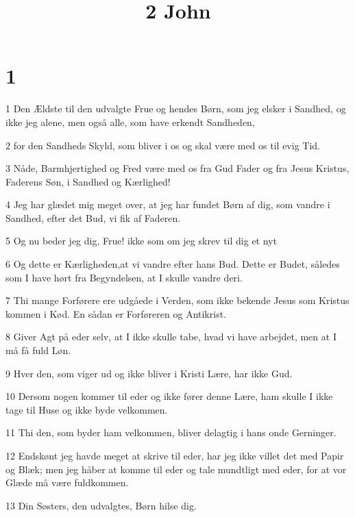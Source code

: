 

\title{2 John}


\chapter{1}

\par 1 Den Ældste til den udvalgte Frue og hendes Børn, som jeg elsker i Sandhed, og ikke jeg alene, men også alle, som have erkendt Sandheden,
\par 2 for den Sandheds Skyld, som bliver i os og skal være med os til evig Tid.
\par 3 Nåde, Barmhjertighed og Fred være med os fra Gud Fader og fra Jesus Kristus, Faderens Søn, i Sandhed og Kærlighed!
\par 4 Jeg har glædet mig meget over, at jeg har fundet Børn af dig, som vandre i Sandhed, efter det Bud, vi fik af Faderen.
\par 5 Og nu beder jeg dig, Frue! ikke som om jeg skrev til dig et nyt
\par 6 Og dette er Kærligheden,at vi vandre efter hans Bud. Dette er Budet, således som I have hørt fra Begyndelsen, at I skulle vandre deri.
\par 7 Thi mange Forførere ere udgåede i Verden, som ikke bekende Jesus som Kristus kommen i Kød. En sådan er Forføreren og Antikrist.
\par 8 Giver Agt på eder selv, at I ikke skulle tabe, hvad vi have arbejdet, men at I må få fuld Løn.
\par 9 Hver den, som viger ud og ikke bliver i Kristi Lære, har ikke Gud.
\par 10 Dersom nogen kommer til eder og ikke fører denne Lære, ham skulle I ikke tage til Huse og ikke byde velkommen.
\par 11 Thi den, som byder ham velkommen, bliver delagtig i hans onde Gerninger.
\par 12 Endskønt jeg havde meget at skrive til eder, har jeg ikke villet det med Papir og Blæk; men jeg håber at komme til eder og tale mundtligt med eder, for at vor Glæde må være fuldkommen.
\par 13 Din Søsters, den udvalgtes, Børn hilse dig.




